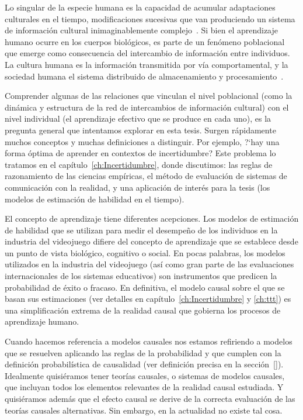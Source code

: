 \documentclass[a4paper,11pt]{book}
\theoremstyle{definition}
\begin{document}

Lo singular de la especie humana es la capacidad de acumular adaptaciones culturales en el tiempo, modificaciones sucesivas que van produciendo un sistema de informaci\'on cultural inimaginablemente complejo~\cite{Tomasello1993, Boyd2011}.
%
Si bien el aprendizaje humano ocurre en los cuerpos biol\'ogicos, es parte de un fen\'omeno poblacional que emerge como consecuencia del intercambio de informaci\'on entre individuos.
%
La cultura humana es la informaci\'on transmitida por v\'ia comportamental, y la sociedad humana el sistema distribuido de almacenamiento y procesamiento~\cite{Derex2020}.


Comprender algunas de las relaciones que vinculan el nivel poblacional (como la din\'amica y estructura de la red de intercambios de informaci\'on cultural) con el nivel individual (el aprendizaje efectivo que se produce en cada uno), es la pregunta general que intentamos explorar en esta tesis.
%
Surgen r\'apidamente muchos conceptos y muchas definiciones a distinguir.
%
Por ejemplo, ?`hay una forma \'optima de aprender en contextos de incertidumbre?
%
Este problema lo tratamos en el cap\'itulo~\ref{ch:Incertidumbre}, donde discutimos: las reglas de razonamiento de las ciencias emp\'iricas, el m\'etodo de evaluaci\'on de sistemas de comunicaci\'on con la realidad, y una aplicaci\'on de inter\'es para la tesis (los modelos de estimaci\'on de habilidad en el tiempo).


El concepto de aprendizaje tiene diferentes acepciones.
%
Los modelos de estimaci\'on de habilidad que se utilizan para medir el desempe\~no de los individuos en la industria del videojuego difiere del concepto de aprendizaje que se establece desde un punto de vista biol\'ogico, cognitivo o social.
%
En pocas palabras, los modelos utilizados en la industria del videojuego (as\'i como gran parte de las evaluaciones internacionales de los sistemas educativos) son instrumentos que predicen la probabilidad de \'exito o fracaso.
%
En definitiva, el modelo causal sobre el que se basan sus estimaciones (ver detalles en cap\'itulo~\ref{ch:Incertidumbre} y \ref{ch:ttt}) es una simplificaci\'on extrema de la realidad causal que gobierna los procesos de aprendizaje humano.


Cuando hacemos referencia a modelos causales nos estamos refiriendo a modelos que se resuelven aplicando las reglas de la probabilidad y que cumplen con la definici\'on probabil\'istica de causalidad (ver definici\'on precisa en la secci\'on~\ref{}).
%
Idealmente quisi\'eramos tener teor\'ias causales, o sistemas de modelos causales, que incluyan todos los elementos relevantes de la realidad causal estudiada.
%
Y quisi\'eramos adem\'as que el efecto causal se derive de la correcta evaluaci\'on de las teor\'ias causales alternativas.
%
Sin embargo, en la actualidad no existe tal cosa.
\end{document}
